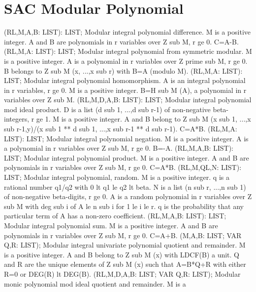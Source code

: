 \section{ SAC Modular Polynomial  } 
 (RL,M,A,B: LIST): LIST; \eproc
\bcom Modular integral polynomial difference. M is a positive integer.
A and B are polynomials in r variables over Z sub M, r ge 0. C=A-B. \ecom 
{} (RL,M,A: LIST): LIST; \eproc
\bcom Modular integral polynomial from symmetric modular. M is a positive
integer.  A is a polynomial in r variables over Z prime sub M, r ge 0.
B belongs to Z sub M (x, ...,x sub r) with B=A (modulo M). \ecom 
{} (RL,M,A: LIST): LIST; \eproc
\bcom Modular integral polynomial homomorphism. A is an integral
polynomial in r variables, r ge 0.  M is a positive integer.
B=H sub M (A), a polynomial in r variables over Z sub M. \ecom 
{} (RL,M,D,A,B: LIST): LIST; \eproc
\bcom Modular integral polynomial mod ideal product. D is a list (d sub
1, ...,d sub r-1) of non-negative beta-integers, r ge 1.  M is a
positive integer.  A and B belong to Z sub M (x sub 1, ...,x sub
r-1,y)/(x sub 1 ** d sub 1, ...,x sub r-1 ** d sub r-1). C=A*B. \ecom 
{} (RL,M,A: LIST): LIST; \eproc
\bcom Modular integral polynomial negation. M is a positive integer. A is
a polynomial in r variables over Z sub M, r ge 0. B=-A. \ecom 
{} (RL,M,A,B: LIST): LIST; \eproc
\bcom Modular integral polynomial product. M is a positive integer. A and
B are polynomials in r variables over Z sub M, r ge 0. C=A*B. \ecom 
{} (RL,M,QL,N: LIST): LIST; \eproc
\bcom Modular integral polynomial, random. M is a positive integer. q is
a rational number q1/q2 with 0 lt q1 le q2 lt beta.  N is a list
(n sub r, ...,n sub 1) of non-negative beta-digits, r ge 0.  A is a
random polynomial in r variables over Z sub M with deg sub i of A le
n sub i for 1 le i le r.  q is the probability that any particular
term of A has a non-zero coefficient. \ecom 
{} (RL,M,A,B: LIST): LIST; \eproc
\bcom Modular integral polynomial sum. M is a positive integer. A and B
are polynomials in r variables over Z sub M, r ge 0. C=A+B. \ecom 
{} (M,A,B: LIST; VAR Q,R: LIST); \eproc
\bcom Modular integral univariate polynomial quotient and remainder. M is
a positive integer.  A and B belong to Z sub M (x) with LDCF(B) a unit.
Q and R are the unique elements of Z sub M (x) such that A=B*Q+R with
either R=0 or DEG(R) lt DEG(B). \ecom 
{} (RL,M,D,A,B: LIST; VAR Q,R: LIST); \eproc
\bcom Modular monic polynomial mod ideal quotient and remainder. M is a
